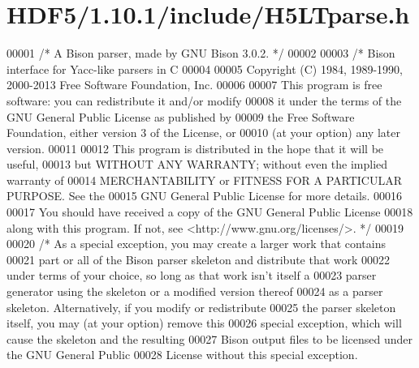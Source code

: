 \hypertarget{_h_d_f5_21_810_81_2include_2_h5_l_tparse_8h_source}{}\section{H\+D\+F5/1.10.1/include/\+H5\+L\+Tparse.h}
\label{_h_d_f5_21_810_81_2include_2_h5_l_tparse_8h_source}

\begin{DoxyCode}
00001 \textcolor{comment}{/* A Bison parser, made by GNU Bison 3.0.2.  */}
00002 
00003 \textcolor{comment}{/* Bison interface for Yacc-like parsers in C}
00004 \textcolor{comment}{}
00005 \textcolor{comment}{   Copyright (C) 1984, 1989-1990, 2000-2013 Free Software Foundation, Inc.}
00006 \textcolor{comment}{}
00007 \textcolor{comment}{   This program is free software: you can redistribute it and/or modify}
00008 \textcolor{comment}{   it under the terms of the GNU General Public License as published by}
00009 \textcolor{comment}{   the Free Software Foundation, either version 3 of the License, or}
00010 \textcolor{comment}{   (at your option) any later version.}
00011 \textcolor{comment}{}
00012 \textcolor{comment}{   This program is distributed in the hope that it will be useful,}
00013 \textcolor{comment}{   but WITHOUT ANY WARRANTY; without even the implied warranty of}
00014 \textcolor{comment}{   MERCHANTABILITY or FITNESS FOR A PARTICULAR PURPOSE.  See the}
00015 \textcolor{comment}{   GNU General Public License for more details.}
00016 \textcolor{comment}{}
00017 \textcolor{comment}{   You should have received a copy of the GNU General Public License}
00018 \textcolor{comment}{   along with this program.  If not, see <http://www.gnu.org/licenses/>.  */}
00019 
00020 \textcolor{comment}{/* As a special exception, you may create a larger work that contains}
00021 \textcolor{comment}{   part or all of the Bison parser skeleton and distribute that work}
00022 \textcolor{comment}{   under terms of your choice, so long as that work isn't itself a}
00023 \textcolor{comment}{   parser generator using the skeleton or a modified version thereof}
00024 \textcolor{comment}{   as a parser skeleton.  Alternatively, if you modify or redistribute}
00025 \textcolor{comment}{   the parser skeleton itself, you may (at your option) remove this}
00026 \textcolor{comment}{   special exception, which will cause the skeleton and the resulting}
00027 \textcolor{comment}{   Bison output files to be licensed under the GNU General Public}
00028 \textcolor{comment}{   License without this special exception.}

\end{DoxyCode}
